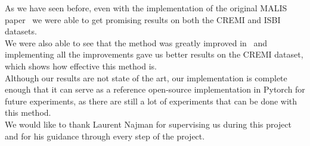 
As we have seen before, even with the implementation of the original MALIS
paper~\cite{turaga_maximin_2009} we were able to get promising results on both
the CREMI and ISBI datasets. \\
We were also able to see that the method was greatly improved
in~\cite{funke_large_2019} and implementing all the improvements gave us
better results on the CREMI dataset, which shows how effective this method
is.\\
Although our results are not state of the art, our implementation is complete
enough that it can serve as a reference open-source implementation in Pytorch
for future experiments, as there are still a lot of experiments that can be
done with this method.\\

We would like to thank Laurent Najman for supervising us during this project
and for his guidance through every step of the project.

